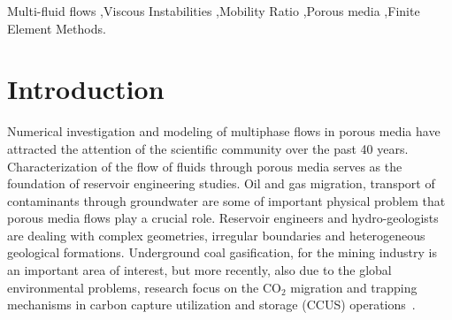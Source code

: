 \documentclass[preprint,authoryear,12pt]{elsarticle}
\newcommand{\JGnote}[1]{\fbox{\parbox{\textwidth}{ \color{red} JG Note $\Rightarrow$ #1}}}
\begin{document}
\begin{frontmatter}
\begin{abstract}

\end{abstract} 

\begin{keyword} %
 Multi-fluid flows \sep Viscous Instabilities \sep Mobility Ratio \sep Porous media \sep Finite Element Methods.
\end{keyword}
 
\end{frontmatter}


\clearpage

\section{Introduction}\label{section:intro}
\medskip
Numerical investigation and modeling of multiphase flows in porous media have attracted the attention of the scientific community over the past 40 years. Characterization of the flow of fluids through porous media serves as the foundation of reservoir engineering studies. Oil and gas migration, transport of contaminants through groundwater are some of important physical problem that porous media flows play a crucial role. Reservoir engineers and hydro-geologists are dealing with complex geometries, irregular boundaries and heterogeneous geological formations.  Underground coal gasification, for the mining industry is an important area of interest, but more recently, also due to the global environmental problems, research focus on the CO$_{\text{2}}$ migration and trapping mechanisms in carbon capture utilization and storage (CCUS) operations~\citep{spycher_2003, chen_2006, self_2012, pruess_1990c, white_1981,jiang_2011}.
\end{document}
